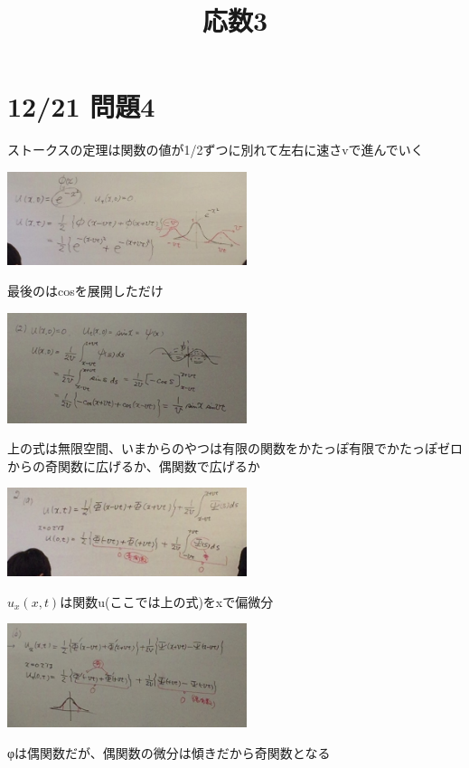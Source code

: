 \documentclass{jsarticle}
\title{応数3}
\begin{document}
\section{12/21 問題4}
	ストークスの定理は関数の値が1/2ずつに別れて左右に速さvで進んでいく
	\begin{center}
		\includegraphics[width=7cm]{12_21_1.JPG}
	\end{center}
	最後のはcosを展開しただけ
	\begin{center}
		\includegraphics[width=7cm]{12_21_2.JPG}
	\end{center}
	上の式は無限空間、いまからのやつは有限の関数をかたっぽ有限でかたっぽゼロからの奇関数に広げるか、偶関数で広げるか
	\begin{center}
		\includegraphics[width=7cm]{12_21_3.JPG}
	\end{center}
	$u_x(x,t)$は関数u(ここでは上の式)をxで偏微分
	\begin{center}
		\includegraphics[width=7cm]{12_21_4.JPG}
	\end{center}
	φは偶関数だが、偶関数の微分は傾きだから奇関数となる\\
	
\end{document}
